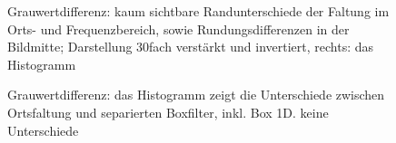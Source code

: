 \documentclass[a4paper,12pt]{article}
\begin{document}
\begin{figure}[htbp]
\caption{Grauwertdifferenz: kaum sichtbare Randunterschiede der Faltung im Orts-
und Frequenzbereich, sowie Rundungsdifferenzen
in der Bildmitte; Darstellung 30fach verstärkt und
invertiert, rechts: das Histogramm}%
\label{figure_border_convolve}
\end{figure}

\begin{figure}[htbp]
\caption{Grauwertdifferenz: das Histogramm zeigt die Unterschiede zwischen
Ortsfaltung und separierten Boxfilter, inkl. Box 1D. keine Unterschiede}%
\label{figure_border_BoxSep}
\end{figure}
\end{document}
